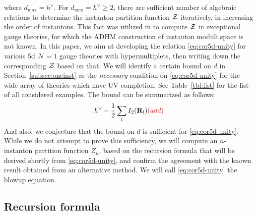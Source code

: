 \documentclass[letterpaper, 11pt]{article}
\def\CZ{{\cal Z}}
\begin{document}
where $d_\text{max} = h^\vee$. For $d_\text{max} = h^\vee \geq 2$, there are sufficient number of algebraic relations to determine the instanton partition function $\CZ$ iteratively, in increasing the order of instantons. This fact was utilized in \cite{Keller:2012da} to compute $\CZ$ in exceptional gauge theories, for which the ADHM construction of instanton moduli space is not known. In this paper, we aim at developing the relation \eqref{eq:cor5d-unity} for various 5d 
$\mathcal{N}=1$ gauge theories with hypermultiplets, then writing down the corresponding $\CZ$ based on that. We will identify a certain bound on $d$ in Section~\ref{subsec:oneinst} as the \emph{necessary} condition on \eqref{eq:cor5d-unity} for the wide array of theories which have UV completion. 
See Table~\ref{tbl:list} for the list of all considered examples. The bound can be summarized as follows:
\begin{align}
  \label{eq:cor5d-dmax}
  h^\vee -\frac{1}{2}\sum_l I_2(\mathbf{R}_l) \textcolor{red}{(add)}
\end{align}
And also, we conjecture that the bound on $d$ is sufficient for \eqref{eq:cor5d-unity}. While we do not attempt to prove this sufficiency, we will compute an $n$-instanton partition function $Z_n$, based on the recursion formula that will be derived shortly from \eqref{eq:cor5d-unity}, and confirm the agreement with the known result obtained from an alternative method.
We will call \eqref{eq:cor5d-unity} the blowup equation. 



\subsection{Recursion formula}
\label{subsec:recursion}
\end{document}
